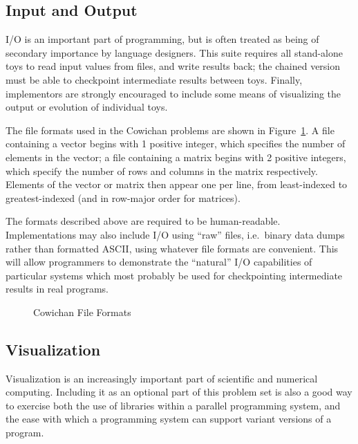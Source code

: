 \subsection{Input and Output\label{s:issues-io}}

I/O is an important part of programming,
but is often treated as being of secondary importance by language designers.
This suite requires all stand-alone toys to read input values from files, and write results back;
the chained version must be able to checkpoint intermediate results between toys.
Finally,
implementors are strongly encouraged to include some means of visualizing the output or evolution of individual toys.

The file formats used in the Cowichan problems are shown in Figure~\ref{f:io-formats}.
A file containing a vector begins with 1 positive integer,
which specifies the number of elements in the vector;
a file containing a matrix begins with 2 positive integers,
which specify the number of rows and columns in the matrix respectively.
Elements of the vector or matrix then appear one per line,
from least-indexed to greatest-indexed
(and in row-major order for matrices).

The formats described above are required to be human-readable.
Implementations may also include I/O using ``raw'' files, i.e.\ binary data dumps rather than formatted ASCII,
using whatever file formats are convenient.
This will allow programmers to demonstrate the ``natural'' I/O capabilities of particular systems
which most probably be used for checkpointing intermediate results in real programs.

\begin{figure}
\caption{Cowichan File Formats\label{f:io-formats}}
\end{figure}

\subsection{Visualization\label{s:issues-vis}}

Visualization is an increasingly important part of scientific and numerical computing.
Including it as an optional part of this problem set is also a good way to exercise both
the use of libraries within a parallel programming system,
and the ease with which a programming system can support variant versions of a program.

